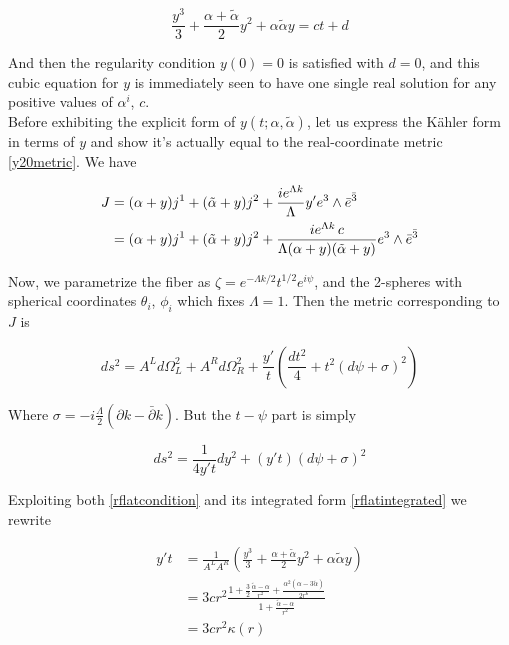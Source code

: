 \begin{equation}
	\frac{y^3}{3} + \frac{\alpha + \tilde{\alpha}}{2} y^2 + \alpha \tilde{\alpha} y = ct + d \label{rflatintegrated}
\end{equation}

And then the regularity condition $y(0)=0$ is satisfied with $d=0$, and this cubic equation for $y$ is immediately seen to have one single real solution for any positive values of $\alpha^i$, $c$.\\

Before exhibiting the explicit form of $y(t;\alpha,\tilde\alpha)$, let us express the K\"ahler form in terms of $y$ and show it's actually equal to the real-coordinate metric \ref{y20metric}. We have

\begin{align}
	\label{Jintermsofy}
	J & =  (\alpha + y) j^1 + (\tilde{\alpha} + y) j^2 + \frac{ie^{\Lambda k}}\Lambda y' e^3 \wedge \bar e^{\bar 3}\\
	  & =  (\alpha + y) j^1 + (\tilde{\alpha} + y) j^2 + \frac{ie^{\Lambda k} \,c}{\Lambda (\alpha + y)(\tilde{\alpha} + y)} e^3 \wedge \bar e^{\bar 3}
\end{align}

Now, we parametrize the fiber as $\zeta = e^{-\Lambda k/2} t^{1/2} e^{i\psi}$, and the 2-spheres with spherical coordinates $\theta_i$, $\phi_i$ which fixes $\Lambda = 1$. Then the metric corresponding to $J$ is

\begin{equation}
	ds^2 = A^L d\Omega^2_L + A^R d\Omega^2_R + \frac{y'}{t} \left( \frac{dt^2}{4} + t^2 (d\psi + \sigma)^2 \right)
\end{equation}

Where $\sigma = -i\frac{\Lambda}{2}(\partial k - \bar \partial k)$. But the $t-\psi$ part is simply

\begin{equation}
	ds^2 = \frac{1}{4y't} dy^2 + (y' t) (d\psi + \sigma)^2
\end{equation}

Exploiting both \ref{rflatcondition} and its integrated form \ref{rflatintegrated} we rewrite

\begin{align}
	y't & = \frac{1}{A^L A^R} \left( \frac{y^3}{3} + \frac{\alpha + \tilde{\alpha}}{2} y^2 + \alpha \tilde{\alpha} y \right)\\
	& = 3cr^2 \frac{1+ \frac{3}{2} \frac{\tilde{\alpha} - \alpha}{r^2} + \frac{\alpha^{2}(\alpha - 3 \tilde{\alpha})}{2r^6} }{1+ \frac{\tilde{\alpha} -\alpha}{r^2} }\\
	& = 3cr^2 \kappa(r)
\end{align}


